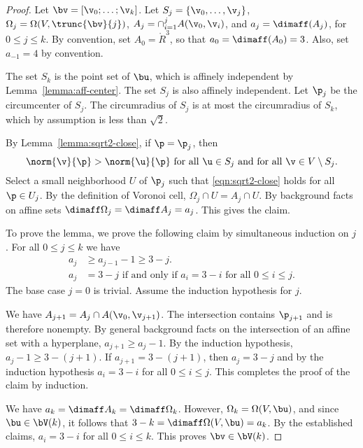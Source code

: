 \begin{proof} 
Let $\bv = [\v_0;\ldots;\v_k]$.  
Let $S_j = \{\v_0,\ldots,\v_j\}$,  
$\Omega_j = \Omega(V,\trunc{\bv}{j})$, 
$A_j=\cap_{i=1}^j A(\v_0,\v_i)$, and $a_j = \dimaff(A_j)$, for $0\le j\le k$.
By convention, set $A_0 = \ring{R}^3$, so that $a_0=\dimaff(A_0) = 3$.
Also, set $a_{-1} = 4$ by convention.

The set $S_k$ is the point set of $\bu$, which is affinely independent
by Lemma~\ref{lemma:aff-center}.  The set $S_j$ is also affinely
independent.  Let $\p_j$ be the circumcenter of $S_j$.  The
circumradius of $S_j$ is at most the circumradius of $S_k$, which by
assumption is less than $\sqrt2$.

By Lemma~\ref{lemma:sqrt2-close}, if $\p=\p_j$, then
\begin{equation}\label{eqn:sqrt2-close} 
\norm{\v}{\p} > \norm{\u}{\p}\text{ for all }\u\in S_j
\text{ and for all }\v\in V\setminus S_j.
\end{equation}   
Select a small neighborhood $U$ of $\p_j$ such that \eqref{eqn:sqrt2-close} holds
for all $\p\in U_j$.  By the definition of Voronoi cell, $\Omega_j \cap U=A_j\cap U$.
By background facts on affine sets $\dimaff\Omega_j = \dimaff A_j=a_j$.  This gives
the claim.

To prove the lemma, we prove the following claim by simultaneous
induction on $j$.  For all $0\le j\le k$ we have
\begin{align*}
a_j &\ge a_{j-1} - 1\ge 3-j.\\
a_j &= 3-j \text{ if and only if } a_i=3-i \text{ for all } 0\le i\le j.
\end{align*}
The base case $j=0$ is trivial.  Assume the induction hypothesis for $j$.

We have $A_{j+1} = A_{j}\cap A(\v_0,\v_{j+1})$.  The intersection
contains $\p_{j+1}$ and is therefore nonempty.  By general background
facts on the intersection of an affine set with a hyperplane, $a_{j+1}
\ge a_{j}-1$.  By the induction hypothesis, $a_{j}-1\ge 3-(j+1)$.  If
$a_{j+1}=3-(j+1)$, then $a_{j}=3-j$ and by the induction hypothesis
$a_{i}=3-i$ for all $0\le i\le j$. This completes the proof of the
claim by induction.

We have $a_k = \dimaff A_k=\dimaff \Omega_k$.  However, $\Omega_k=
\Omega(V,\bu)$, and since $\bu\in \bV(k)$, it follows that
$3-k=\dimaff\Omega(V,\bu)=a_k$.  By the established claims, $a_i = 3-i$
for all $0\le i\le k$.  This proves $\bv\in\bV(k)$.


\end{proof}
